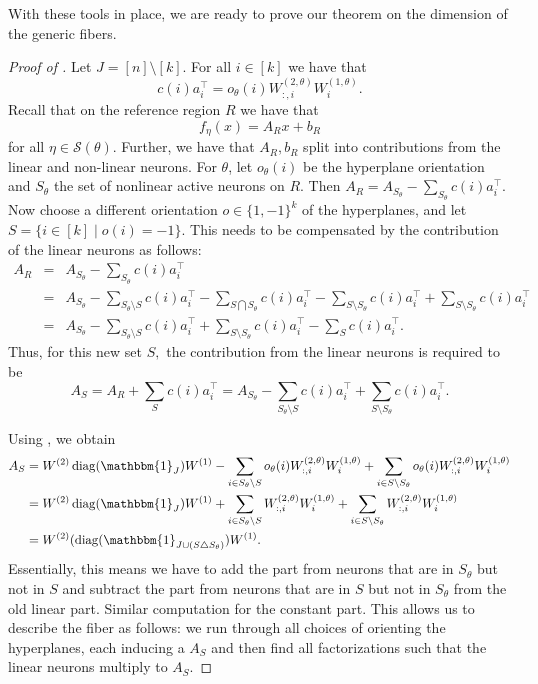 \documentclass{article}
\theoremstyle{definition}
\newcommand{\weights}[1]{W^{(#1)}}
\newcommand{\diag}{\operatorname{diag}}
\newcommand{\ind}{\mathbbm{1}}
\begin{document}
With these tools in place, we are ready to prove our theorem on the dimension of the generic fibers. 

\thmlayerwisefibers* 

\begin{proof}[Proof of ]

Let $J=[n]\setminus[k]$.
For all $i \in [k]$ we have that 
\begin{equation}
\label{eq:linearpart_flipped_neurons}
     c(i) a_i^\top =  o_\theta(i)\weights{2,\theta}_{:,i} \weights{1,\theta}_i . 
\end{equation}
Recall that on the reference region $R$ we have that $$f_\eta(x)=A_Rx+b_R$$ for all $\eta\in\mathcal{S}(\theta).$ Further, we have that $A_R,b_R$ split into contributions from the linear and non-linear neurons. For $\theta$, let $o_\theta(i)$ be the hyperplane orientation and $S_\theta$ the set of nonlinear active neurons on $R.$ Then $A_R=A_{S_\theta}-\sum_{S_\theta}c(i)a_i^\top.$
Now choose a different orientation $o\in\{1,-1\}^k$ of the hyperplanes, and let $S = \{i\in[k]\mid o(i)=-1\}$. This needs to be compensated by the contribution of the linear neurons as follows:
\begin{eqnarray*}
    A_R&=&A_{S_\theta}-\sum_{S_\theta}c(i)a_i^\top\\
    &=&A_{S_\theta}-\sum_{S_\theta\setminus S}c(i)a_i^\top-\sum_{S\bigcap S_\theta}c(i)a_i^\top-\sum_{S\setminus S_\theta}c(i)a_i^\top + \sum_{S\setminus S_\theta}c(i)a_i^\top\\
    &=&A_{S_\theta}-\sum_{S_\theta\setminus S}c(i)a_i^\top+\sum_{S\setminus S_\theta}c(i)a_i^\top-\sum_{S}c(i)a_i^\top. 
\end{eqnarray*}
Thus, for this new set $S,$ the contribution from the linear neurons is required to be 
\[
A_S = A_R+ \sum_S c(i)a_i^\top =A_{S_\theta}-\sum_{S_\theta\setminus S}c(i)a_i^\top+\sum_{S\setminus S_\theta}c(i)a_i^\top . 
\]

Using , we obtain \begin{align*}
   A_S&= \weights{2}\diag(\ind_J)\weights{1} -  \sum_{i \in S_\theta \setminus S}  o_\theta(i)\weights{2,\theta}_{:,i} \weights{1,\theta}_i + \sum_{i \in S \setminus S_\theta}  o_\theta(i)\weights{2,\theta}_{:,i} \weights{1,\theta}_i \\&= \weights{2}\diag(\ind_J)\weights{1} +  \sum_{i \in S_\theta \setminus S}  \weights{2,\theta}_{:,i} \weights{1,\theta}_i + \sum_{i \in S \setminus S_\theta}  \weights{2,\theta}_{:,i} \weights{1,\theta}_i \\&= \weights{2}(\diag(\ind_{J \cup (S \triangle S_\theta)}) \weights{1} . 
\end{align*}
Essentially, this means we have to add the part from neurons that are in $S_\theta$ but not in $S$ and subtract the part from neurons that are in $S$ but not in $S_\theta$ from the old linear part.
Similar computation for the constant part. 
This allows us to describe the fiber as follows: we run through all choices of orienting the hyperplanes, each inducing a $A_S$ and then find all factorizations such that the linear neurons multiply to $A_S.$


\end{proof}
\end{document}
